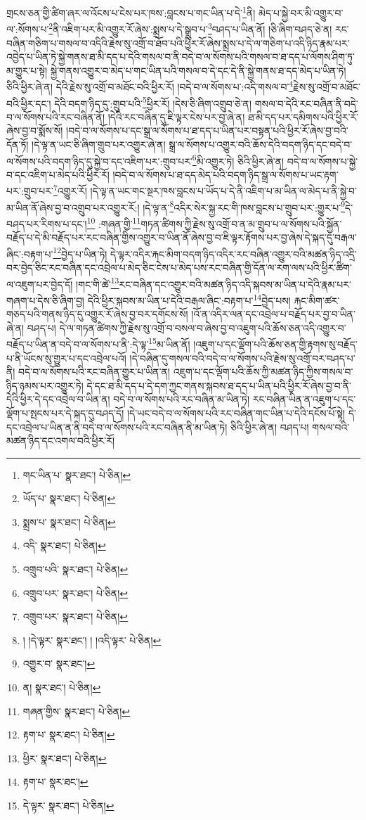 གྲངས་ཅན་གྱི་ཚིག་ཞར་ལ་འོངས་པ་ངེས་པར་ཁས་:བླངས་པ་གང་ཡིན་པ་དེ་\footnote{གང་ཡིན་པ་  སྣར་ཐང་།  པེ་ཅིན། }ནི། མེད་པ་སྐྱེ་བར་མི་འགྱུར་བ་ལ་:སོགས་པ་\footnote{ཡོད་པ་  སྣར་ཐང་།  པེ་ཅིན། }ནི་འཇིག་པར་མི་འགྱུར་རོ་ཞེས་:སྨྲས་པ་དེ་སྒྲུབ་པ་\footnote{སྨྲས་པ་  སྣར་ཐང་།  པེ་ཅིན། }བཤད་པ་ཡིན་ནོ། །ཅི་ཞིག་བཤད་ཅེ་ན། རང་བཞིན་གཅིག་པ་གསལ་བ་འདིའི་རྗེས་སུ་འགྲོ་བ་ཐོབ་པའི་ཕྱིར་རོ་ཞེས་སྨྲས་པ་དེ་ལ་གཅིག་པ་འདི་ཉིད་རྣམ་པར་འབྱེད་པ་ཡིན་ཏེ་སྐྱེ་གནས་ཐ་མི་དད་པ་དེའི་གསལ་བ་ནི་བདེ་བ་ལ་སོགས་པའི་གསལ་བ་ཐ་དད་པ་ལོགས་ཤིག་ཏུ་མ་གྱུར་པ་སྟེ། སྐྱེ་གནས་འགྱུར་བ་མེད་པ་གང་ཡིན་པའི་གསལ་བ་དེ་དང་དེ་ནི་སྐྱེ་གནས་ཐ་དད་མེད་པ་ཡིན་ཏེ། ཅིའི་ཕྱིར་ཞེ་ན། དེའི་རྗེས་སུ་འགྲོ་བ་མཐོང་བའི་ཕྱིར་རོ། །བདེ་བ་ལ་སོགས་པ་:འདི་གསལ་བ་\footnote{འདི་  སྣར་ཐང་།  པེ་ཅིན། }རྗེས་སུ་འགྲོ་བ་མཐོང་བའི་ཕྱིར་དང་། དེའི་བདག་ཉིད་དུ་:གྲུབ་པའི་\footnote{འགྲུབ་པའི་  སྣར་ཐང་།  པེ་ཅིན། }ཕྱིར་རོ། །དེས་ཅི་ཞིག་འགྲུབ་ཅེ་ན། གསལ་བ་དེའི་རང་བཞིན་ནི་བདེ་བ་ལ་སོགས་པའི་རང་བཞིན་ནོ། །དེའི་རང་བཞིན་དུ་ཇི་ལྟར་ངེས་པར་བྱ་ཞེ་ན། ཐ་མི་དད་པར་དམིགས་པའི་ཕྱིར་རོ་ཞེས་བྱ་བ་སྨོས་སོ། །བདེ་བ་ལ་སོགས་པ་དང་སྒྲ་ལ་སོགས་པ་ཐ་དད་པ་ཡིན་པར་བསྟན་པའི་ཕྱིར་རོ་ཞེས་བྱ་བའི་དོན་ཏོ། །དེ་ལྟ་ན་ཡང་ཅི་ཞིག་གྲུབ་པར་འགྱུར་ཞེ་ན། སྒྲ་ལ་སོགས་པ་འགྱུར་བའི་ཆོས་དེའི་བདག་ཉིད་དང་བདེ་བ་ལ་སོགས་པའི་བདག་ཉིད་དུ་སྐྱེ་བ་དང་འཇིག་པར་:གྲུབ་པར་\footnote{འགྲུབ་པར་  སྣར་ཐང་།  པེ་ཅིན། }མི་འགྱུར་ཏེ། ཅིའི་ཕྱིར་ཞེ་ན། བདེ་བ་ལ་སོགས་པ་སྐྱེ་བ་དང་འཇིག་པ་མེད་པའི་ཕྱིར་རོ། །བདེ་བ་ལ་སོགས་པ་ཐ་དད་མེད་པའི་བདག་ཉིད་སྒྲ་ལ་སོགས་པ་ཡང་རྟག་པར་:གྲུབ་པར་\footnote{འགྲུབ་པར་  སྣར་ཐང་།  པེ་ཅིན། }འགྱུར་རོ། །དེ་ལྟ་ན་ཡང་གང་སྔར་ཁས་བླངས་པ་ཡོད་པ་དེ་ནི་འཇིག་པ་མ་ཡིན་ལ་མེད་པ་ནི་སྐྱེ་བ་མ་ཡིན་ནོ་ཞེས་བྱ་བ་འགྲུབ་པར་འགྱུར་རོ:། །དེ་ལྟ་ན་\footnote{། །དེ་ལྟར་  སྣར་ཐང་། ། །འདི་ལྟར་  པེ་ཅིན། }འདིར་སེར་སྐྱ་རང་གི་ཁས་བླངས་པ་གྲུབ་པར་:གྱུར་པ་\footnote{འགྱུར་བ་  སྣར་ཐང་། }དེ་བཤད་པར་རིགས་པ་དང་།\footnote{ན།  སྣར་ཐང་།  པེ་ཅིན། } :གཞན་གྱི་\footnote{གཞན་གྱིས་  སྣར་ཐང་།  པེ་ཅིན། }གཏན་ཚིགས་ཀྱི་རྗེས་སུ་འགྲོ་བ་ན་མ་གྲུབ་པ་ལ་སོགས་པའི་སྐྱོན་བརྗོད་པ་དེ་མི་བརྗོད་པར་རང་བཞིན་གྱིས་འགྱུར་བ་ཡིན་ནོ་ཞེས་བྱ་བ་ཇི་ལྟར་རྟོགས་པར་བྱ་ཞེས་དེ་སྐད་དུ་བརྒལ་ཞིང་:བརྟག་པ་\footnote{རྟག་པ་  སྣར་ཐང་།  པེ་ཅིན། }བྱེད་པ་ཡིན་ཏེ། དེ་ལྟར་འདིར་རྐང་མིག་བདག་ཉིད་འདིར་རང་བཞིན་འགྱུར་བའི་མཚན་ཉིད་འདྲི་བར་བྱེད་ཅིང་རང་བཞིན་དང་འབྲེལ་པ་མེད་ཅིང་ངེས་པ་མེད་པས་རང་བཞིན་གྱི་དོན་ལ་རག་ལས་པའི་ཕྱིར་ཚིག་ལ་འཇུག་པར་བྱེད་དོ། །གང་གི་ཚེ་\footnote{ཕྱིར་  སྣར་ཐང་།  པེ་ཅིན། }རང་བཞིན་དང་འགྱུར་བའི་མཚན་ཉིད་འདི་སྐབས་མ་ཡིན་པ་དེའི་རྣམ་པར་གཞག་པ་དེས་ཅི་ཞིག་བྱ། དེའི་ཕྱིར་སྐབས་མ་ཡིན་པ་དེའི་བརྒལ་ཞིང་:བརྟག་པ་\footnote{རྟག་པ་  སྣར་ཐང་། }བྱེད་པས། རྐང་མིག་ཚར་གཅད་པའི་གནས་ཉིད་དུ་འགྱུར་རོ་ཞེས་བྱ་བར་དགོངས་སོ། །འོ་ན་འདིར་ལན་དང་འབྲེལ་པ་བརྗོད་པར་བྱ་བ་ཡིན་ཞེ་ན། བཤད་པ། དེ་ལ་གཏན་ཚིགས་ཀྱི་རྗེས་སུ་འགྲོ་བ་བསལ་བ་ཞེས་བྱ་བ་འཇུག་པའི་ཆོས་ཅན་འདི་འགྱུར་བ་བརྗོད་པ་ཡིན་ན་བདེ་བ་ལ་སོགས་པ་ནི་:དེ་ལྟ་\footnote{དེ་ལྟར་  སྣར་ཐང་།  པེ་ཅིན། }མ་ཡིན་ནོ། །འཇུག་པ་དང་ལྡོག་པའི་ཆོས་ཅན་གྱི་རྟགས་སུ་བརྗོད་པ་ནི་ཡོངས་སུ་གྱུར་པ་དང་འབྲེལ་པའོ། །དེ་བཞིན་དུ་གསལ་བའི་བདེ་བ་ལ་སོགས་པའི་རྗེས་སུ་འགྲོ་བར་བཤད་པ་ནི། བདེ་བ་ལ་སོགས་པའི་རང་བཞིན་གྱུར་པ་ཡིན་ན། འཇུག་པ་དང་ལྡོག་པའི་ཆོས་ཀྱི་མཚན་ཉིད་ཀྱིས་གསལ་བ་ཉིད་ཉམས་པར་འགྱུར་ཏེ། དེ་དང་ཐ་མི་དད་པ་དེ་དག་ཀྱང་གནས་སྐབས་ཐ་དད་པ་ཡིན་པའི་ཕྱིར་རོ་ཞེས་བྱ་བ་ནི་དེའི་ཕྱིར་དེ་དང་འབྲེལ་བ་ཡིན་ན། བདེ་བ་ལ་སོགས་པའི་རང་བཞིན་མ་ཡིན་ཏེ། རང་བཞིན་ཡིན་ན་འཇུག་པ་དང་ལྡོག་པ་སྤངས་པར་དེ་སྐད་དུ་བཤད་དོ། །དེ་ཡང་བདེ་བ་ལ་སོགས་པའི་རང་བཞིན་གང་ཡིན་པ་དེའི་དངོས་པོ་སྟེ། དེ་དང་འབྲེལ་པ་ཡིན་ན་ནི་བདེ་བ་ལ་སོགས་པའི་རང་བཞིན་ནི་མ་ཡིན་ཏེ། ཅིའི་ཕྱིར་ཞེ་ན། བཤད་པ། གསལ་བའི་མཚན་ཉིད་དང་འགལ་བའི་ཕྱིར་རོ། 